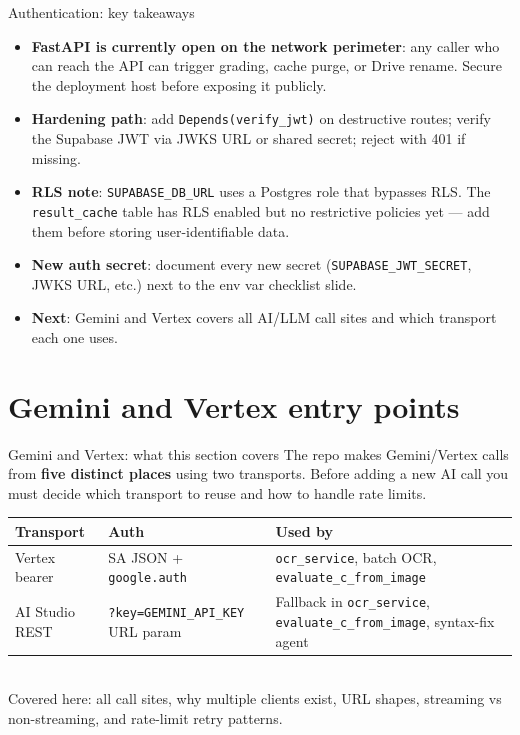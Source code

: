 \documentclass[aspectratio=169]{beamer}
\begin{document}
\begin{frame}{Authentication: key takeaways}
  \small
  \begin{itemize}\setlength\itemsep{0.3em}
    \item \textbf{FastAPI is currently open on the network perimeter}: any caller who can reach the API can trigger grading, cache purge, or Drive rename. Secure the deployment host before exposing it publicly.
    \item \textbf{Hardening path}: add \texttt{Depends(verify\_jwt)} on destructive routes; verify the Supabase JWT via JWKS URL or shared secret; reject with 401 if missing.
    \item \textbf{RLS note}: \texttt{SUPABASE\_DB\_URL} uses a Postgres role that bypasses RLS. The \texttt{result\_cache} table has RLS enabled but no restrictive policies yet --- add them before storing user-identifiable data.
    \item \textbf{New auth secret}: document every new secret (\texttt{SUPABASE\_JWT\_SECRET}, JWKS URL, etc.) next to the env var checklist slide.
    \item \textbf{Next}: Gemini and Vertex covers all AI/LLM call sites and which transport each one uses.
  \end{itemize}
\end{frame}

\section{Gemini and Vertex entry points}

\begin{frame}{Gemini and Vertex: what this section covers}
  \small
  The repo makes Gemini/Vertex calls from \textbf{five distinct places} using two transports.
  Before adding a new AI call you must decide which transport to reuse and how to handle rate limits.\\[0.4em]
  \begin{tabular}{@{}p{3.0cm}p{4.0cm}p{6.7cm}@{}}
    \toprule
    Transport & Auth & Used by \\
    \midrule
    Vertex bearer & SA JSON + \texttt{google.auth} & \texttt{ocr\_service}, batch OCR, \texttt{evaluate\_c\_from\_image} \\
    AI Studio REST & \texttt{?key=GEMINI\_API\_KEY} URL param & Fallback in \texttt{ocr\_service}, \texttt{evaluate\_c\_from\_image}, syntax-fix agent \\
    \bottomrule
  \end{tabular}
  \vspace{0.3em}\\
  \footnotesize Covered here: all call sites, why multiple clients exist, URL shapes, streaming vs non-streaming, and rate-limit retry patterns.
\end{frame}
\end{document}
